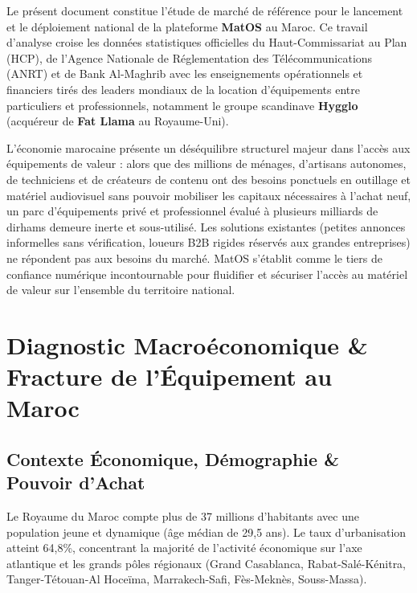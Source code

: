 \documentclass[11pt,a4paper]{report}
\begin{document}
\begin{tcolorbox}[execbox]
Le présent document constitue l'étude de marché de référence pour le lancement et le déploiement national de la plateforme \textbf{MatOS} au Maroc. Ce travail d'analyse croise les données statistiques officielles du Haut-Commissariat au Plan (HCP), de l'Agence Nationale de Réglementation des Télécommunications (ANRT) et de Bank Al-Maghrib avec les enseignements opérationnels et financiers tirés des leaders mondiaux de la location d'équipements entre particuliers et professionnels, notamment le groupe scandinave \textbf{Hygglo} (acquéreur de \textbf{Fat Llama} au Royaume-Uni).

L'économie marocaine présente un déséquilibre structurel majeur dans l'accès aux équipements de valeur : alors que des millions de ménages, d'artisans autonomes, de techniciens et de créateurs de contenu ont des besoins ponctuels en outillage et matériel audiovisuel sans pouvoir mobiliser les capitaux nécessaires à l'achat neuf, un parc d'équipements privé et professionnel évalué à plusieurs milliards de dirhams demeure inerte et sous-utilisé. Les solutions existantes (petites annonces informelles sans vérification, loueurs B2B rigides réservés aux grandes entreprises) ne répondent pas aux besoins du marché. MatOS s'établit comme le tiers de confiance numérique incontournable pour fluidifier et sécuriser l'accès au matériel de valeur sur l'ensemble du territoire national.
\end{tcolorbox}

\chapter{Diagnostic Macroéconomique \& Fracture de l'Équipement au Maroc}

\section{Contexte Économique, Démographie \& Pouvoir d'Achat}
Le Royaume du Maroc compte plus de 37 millions d'habitants avec une population jeune et dynamique (âge médian de 29,5 ans). Le taux d'urbanisation atteint 64,8\%, concentrant la majorité de l'activité économique sur l'axe atlantique et les grands pôles régionaux (Grand Casablanca, Rabat-Salé-Kénitra, Tanger-Tétouan-Al Hoceïma, Marrakech-Safi, Fès-Meknès, Souss-Massa).
\end{document}
